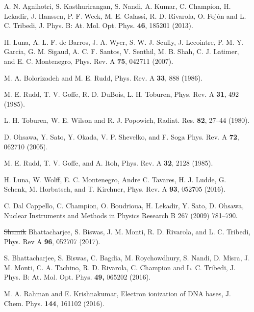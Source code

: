 \documentclass[10pt,showpacs,showkeys,twocolumn]{revtex4-1}
\providecommand{\DIFadd}[1]{{\protect\color{blue}\uwave{#1}}} %
\providecommand{\DIFdel}[1]{{\protect\color{red}\sout{#1}}}                      %
\providecommand{\DIFaddbegin}{} %
\providecommand{\DIFaddend}{} %
\providecommand{\DIFdelbegin}{} %
\providecommand{\DIFdelend}{} %
\newcommand{\DIFscaledelfig}{0.5}
\newlength{\DIFdelgraphicswidth} %
\newlength{\DIFdelgraphicsheight} %
\newcommand{\DIFaddincludegraphics}[2][]{{\color{blue}\fbox{\DIFOincludegraphics[#1]{#2}}}} %
\newcommand{\DIFdelincludegraphics}[2][]{%
\sbox{\DIFdelgraphicsbox}{\DIFOincludegraphics[#1]{#2}}%
\settoboxwidth{\DIFdelgraphicswidth}{\DIFdelgraphicsbox} %
\settoboxtotalheight{\DIFdelgraphicsheight}{\DIFdelgraphicsbox} %
\scalebox{\DIFscaledelfig}{%
\parbox[b]{\DIFdelgraphicswidth}{\usebox{\DIFdelgraphicsbox}\\[-\baselineskip] \rule{\DIFdelgraphicswidth}{0em}}\llap{\resizebox{\DIFdelgraphicswidth}{\DIFdelgraphicsheight}{%
\setlength{\unitlength}{\DIFdelgraphicswidth}%
\begin{picture}(1,1)%
\thicklines\linethickness{2pt} %
{\color[rgb]{1,0,0}\put(0,0){\framebox(1,1){}}}%
{\color[rgb]{1,0,0}\put(0,0){\line( 1,1){1}}}%
{\color[rgb]{1,0,0}\put(0,1){\line(1,-1){1}}}%
\end{picture}%
}\hspace*{3pt}}} %
} %
\DeclareRobustCommand{\DIFaddbegin}{\DIFOaddbegin \let\includegraphics\DIFaddincludegraphics} %
\DeclareRobustCommand{\DIFaddend}{\DIFOaddend \let\includegraphics\DIFOincludegraphics} %
\DeclareRobustCommand{\DIFdelbegin}{\DIFOdelbegin \let\includegraphics\DIFdelincludegraphics} %
\DeclareRobustCommand{\DIFdelend}{\DIFOaddend \let\includegraphics\DIFOincludegraphics} %
\begin{document}
\begin{thebibliography}{}
A. N. Agnihotri, S. Kasthurirangan, S. Nandi, A. Kumar, C. Champion, 
H. Lekadir, J. Hanssen, P. F. Weck, M. E. Galassi, R. D. Rivarola, 
O. Foj\'on and L. C. Tribedi, 
J. Phys. B: At. Mol. Opt. Phys. \textbf{46}, 185201 (2013).

H. Luna, A. L. F. de Barros, J. A. Wyer, S. W. J. Scully, J. Lecointre, 
P. M. Y. Garcia, G. M. Sigaud, A. C. F. Santos, V. Senthil, M. B. Shah, 
C. J. Latimer, and E. C. Montenegro,
Phys. Rev. A \textbf{75}, 042711 (2007).

M. A. Bolorizadeh and M. E. Rudd, 
Phys. Rev. A \textbf{33}, 888 (1986). 

M. E. Rudd, T. V. Goffe, R. D. DuBois, L. H. Toburen, 
Phys. Rev. A \textbf{31}, 492 (1985). 

L. H. Toburen, W. E. Wilson and R. J. Popowich,
Radiat. Res. \textbf{82}, 27--44 (1980).

D. Ohsawa, Y. Sato, Y. Okada, V. P. Shevelko, and F. Soga
Phys. Rev. A \textbf{72}, 062710 (2005).

M. E. Rudd, T. V. Goffe, and A. Itoh, 
Phys. Rev. A \textbf{32}, 2128 (1985).


H. Luna, W. Wolff, E. C. Montenegro, Andre C. Tavares, H. J. Ludde, 
G. Schenk, M. Horbatsch, and T. Kirchner, 
Phys. Rev. A \textbf{93}, 052705 (2016).  

C. Dal Cappello, C. Champion, O. Boudrioua, H. Lekadir, Y. Sato, 
D. Ohsawa, 
Nuclear Instruments and Methods in Physics Research B 267 (2009) 781--790.

\DIFdelbegin \DIFdel{Shamik }\DIFdelend \DIFaddbegin \DIFadd{S. }\DIFaddend Bhattacharjee, S. Biswas, J. M. Monti, R. D. Rivarola, and 
L. C. Tribedi,
Phys. Rev A \textbf{96}, 052707 (2017).

S. Bhattacharjee, S. Biswas, C. Bagdia, M. Roychowdhury, S. Nandi, 
D. Misra, J. M. Monti, C. A. Tachino, R. D. Rivarola, C. Champion and 
L. C. Tribedi, J. 
Phys. B: At. Mol. Opt. Phys. \textbf{49,}  065202 (2016).

M. A. Rahman and E. Krishnakumar,
Electron ionization of DNA bases,
J. Chem. Phys. \textbf{144}, 161102 (2016).



\end{thebibliography}
\end{document}
